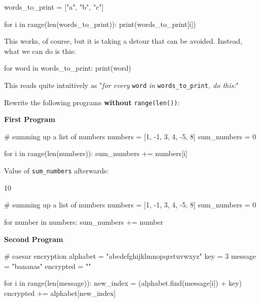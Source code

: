 \begin{pythoncode}
words_to_print = ["a", "b", "c"]

for i in range(len(words_to_print)):
    print(words_to_print[i])
\end{pythoncode}

\noindent This works, of course, but it is taking a detour that can be avoided. Instead, what we can do is this:

\begin{pythoncode}
for word in words_to_print:
    print(word)
\end{pythoncode}

\noindent This reads quite intuitively as "\textit{for every} \texttt{word} \textit{in} \texttt{words\_to\_print}\textit{, do this:}"

\vspace{1em}

\noindent Rewrite the following programs \textbf{without} \texttt{range(len())}:

\vspace{1em}

\noindent \textbf{First Program}

\begin{pythoncode}
# summing up a list of numbers
numbers = [1, -1, 3, 4, -5, 8]
sum_numbers = 0

for i in range(len(numbers)):
    sum_numbers += numbers[i]
\end{pythoncode}

\noindent Value of \texttt{sum\_numbers} afterwards:

\begin{outputcode}
10
\end{outputcode}

\begin{solution}
    \begin{pythoncode}
# summing up a list of numbers
numbers = [1, -1, 3, 4, -5, 8]
sum_numbers = 0

for number in numbers:
    sum_numbers += number
    \end{pythoncode}
\end{solution}

\noindent \textbf{Second Program}

\begin{pythoncode}
# caesar encryption
alphabet    = "abcdefghijklmnopqrstuvwxyz"
key         = 3
message     = "bananas"
encrypted   = ""

for i in range(len(message)):
    new_index = (alphabet.find(message[i]) + key) %
    encrypted += alphabet[new_index]
\end{pythoncode}

